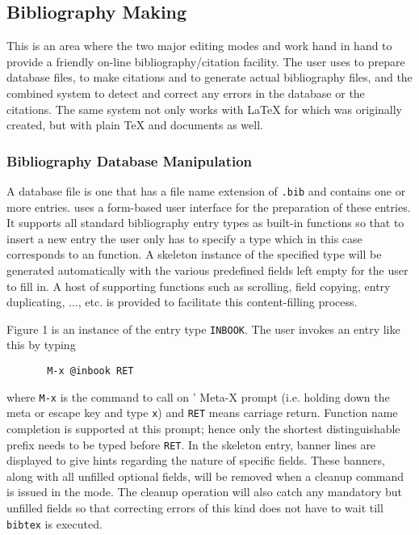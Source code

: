 \subsection{Bibliography Making}
This is an area where the two major editing modes {\TM} and {\BM} work hand in
hand to provide a friendly on-line bibliography/citation facility.
The user uses {\BM} to prepare {\BibTeX} database files,
{\TM} to make citations and to generate actual bibliography files, and
the combined system to detect and correct any errors in the database or
the citations.
The same system not only works with {\LaTeX} for which {\BibTeX}
was originally created, but with plain {\TeX} and {\AmSTeX} documents as well.

\subsubsection{Bibliography Database Manipulation}
A {\BibTeX} database file is one that has a file name extension of \verb|.bib|
and contains one or more {\BibTeX} entries.
{\BM} uses a form-based user interface for the preparation of
these entries.
It supports all standard {\BibTeX} bibliography entry types as built-in
functions so that to insert a new entry the user only has to specify a type
which in this case corresponds to an {\emacs} function.
A skeleton instance of the specified type will be generated automatically
with the various predefined fields left empty for the user to fill in.
A host of supporting functions such as scrolling, field copying,
entry duplicating, ..., etc. is provided to facilitate this content-filling
process.

Figure 1 is an instance of the entry type \verb|INBOOK|.
The user invokes an entry like this by typing
\begin{verbatim}
       M-x @inbook RET
\end{verbatim}
where \verb|M-x| is the command to call on
{\emacs}' Meta-X prompt (i.e. holding down the meta or
escape key and type \verb|x|) and \verb|RET| means carriage return.
Function name completion is supported at this prompt;
hence only the shortest distinguishable prefix needs to be typed
before \verb|RET|.  In the skeleton entry,
banner lines are displayed to give hints regarding the nature of
specific fields.  These banners, along with all unfilled optional fields,
will be removed when a cleanup command is issued in the mode.
The cleanup operation will also catch any mandatory but unfilled fields so that
correcting errors of this kind does not have to wait till
\verb|bibtex| is executed.

